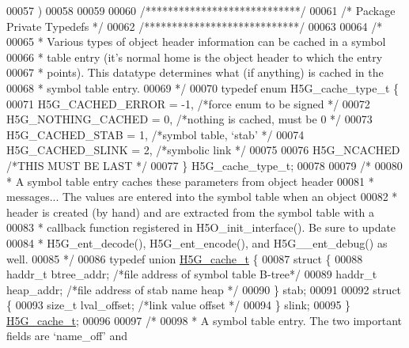 \begin{DoxyCode}
00057 \textcolor{preprocessor}{    )}
00058 
00059 
00060 \textcolor{comment}{/****************************/}
00061 \textcolor{comment}{/* Package Private Typedefs */}
00062 \textcolor{comment}{/****************************/}
00063 
00064 \textcolor{comment}{/*}
00065 \textcolor{comment}{ * Various types of object header information can be cached in a symbol}
00066 \textcolor{comment}{ * table entry (it's normal home is the object header to which the entry}
00067 \textcolor{comment}{ * points).  This datatype determines what (if anything) is cached in the}
00068 \textcolor{comment}{ * symbol table entry.}
00069 \textcolor{comment}{ */}
00070 \textcolor{keyword}{typedef} \textcolor{keyword}{enum} H5G\_cache\_type\_t \{
00071     H5G\_CACHED\_ERROR    = -1,   \textcolor{comment}{/*force enum to be signed            */}
00072     H5G\_NOTHING\_CACHED  = 0,    \textcolor{comment}{/*nothing is cached, must be 0               */}
00073     H5G\_CACHED\_STAB     = 1,    \textcolor{comment}{/*symbol table, `stab'                       */}
00074     H5G\_CACHED\_SLINK    = 2,    \textcolor{comment}{/*symbolic link                  */}
00075 
00076     H5G\_NCACHED                 \textcolor{comment}{/*THIS MUST BE LAST                          */}
00077 \} H5G\_cache\_type\_t;
00078 
00079 \textcolor{comment}{/*}
00080 \textcolor{comment}{ * A symbol table entry caches these parameters from object header}
00081 \textcolor{comment}{ * messages...  The values are entered into the symbol table when an object}
00082 \textcolor{comment}{ * header is created (by hand) and are extracted from the symbol table with a}
00083 \textcolor{comment}{ * callback function registered in H5O\_init\_interface().  Be sure to update}
00084 \textcolor{comment}{ * H5G\_ent\_decode(), H5G\_ent\_encode(), and H5G\_\_ent\_debug() as well.}
00085 \textcolor{comment}{ */}
00086 \textcolor{keyword}{typedef} \textcolor{keyword}{union }\hyperlink{union_h5_g__cache__t}{H5G\_cache\_t} \{
00087     \textcolor{keyword}{struct }\{
00088         haddr\_t btree\_addr;             \textcolor{comment}{/*file address of symbol table B-tree*/}
00089         haddr\_t heap\_addr;              \textcolor{comment}{/*file address of stab name heap     */}
00090     \} stab;
00091 
00092     \textcolor{keyword}{struct }\{
00093     \textcolor{keywordtype}{size\_t}  lval\_offset;        \textcolor{comment}{/*link value offset          */}
00094     \} slink;
00095 \} \hyperlink{union_h5_g__cache__t}{H5G\_cache\_t};
00096 
00097 \textcolor{comment}{/*}
00098 \textcolor{comment}{ * A symbol table entry.  The two important fields are `name\_off' and}

\end{DoxyCode}
